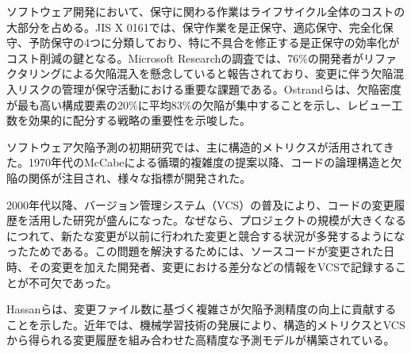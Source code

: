 ソフトウェア開発において、保守に関わる作業はライフサイクル全体のコストの大部分を占める。JIS X 0161では、保守作業を是正保守、適応保守、完全化保守、予防保守の4つに分類しており\cite{jisx0161}、特に不具合を修正する是正保守の効率化がコスト削減の鍵となる。Microsoft Researchの調査では、76\%の開発者がリファクタリングによる欠陥混入を懸念していると報告されており\cite{kim2014}、変更に伴う欠陥混入リスクの管理が保守活動における重要な課題である。Ostrandらは、欠陥密度が最も高い構成要素の20\%に平均83\%の欠陥が集中することを示し\cite{ostrand2005}、レビュー工数を効果的に配分する戦略の重要性を示唆した。

ソフトウェア欠陥予測の初期研究では、主に構造的メトリクスが活用されてきた。1970年代のMcCabeによる循環的複雑度の提案\cite{mccabe1976}以降、コードの論理構造と欠陥の関係が注目され、様々な指標が開発された。

2000年代以降、バージョン管理システム（VCS）の普及により、コードの変更履歴を活用した研究が盛んになった。なぜなら、プロジェクトの規模が大きくなるにつれて、新たな変更が以前に行われた変更と競合する状況が多発するようになったためである。この問題を解決するためには、ソースコードが変更された日時、その変更を加えた開発者、変更における差分などの情報をVCSで記録することが不可欠であった。

Hassan\cite{hassan2009}らは、変更ファイル数に基づく複雑さが欠陥予測精度の向上に貢献することを示した。近年では、機械学習技術の発展により、構造的メトリクスとVCSから得られる変更履歴を組み合わせた高精度な予測モデルが構築されている。